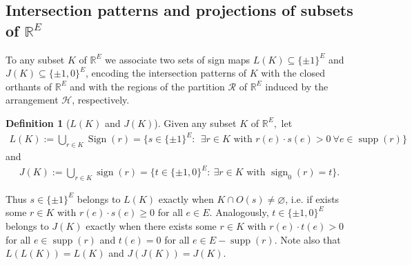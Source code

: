 \documentclass[11pt,a4paper]{amsart}
\theoremstyle{definition}
\newtheorem{definition}{Definition}
\numberwithin{equation}{section}
\DeclareMathOperator{\supp}{supp}
\DeclareMathOperator{\sign}{sign}
\DeclareMathOperator{\Baryc}{Baryc}
\DeclareMathOperator{\Sign}{Sign}
\newcommand{\covectors}{\ensuremath{L}}
\newcommand{\OO}{\ensuremath{{O}}}
\newcommand{\hcovectors}{J}
\begin{document}



\subsection{Intersection patterns and projections of subsets  of ${\mathbb R}^E$} To any subset $K$ of ${\mathbb R}^E$ we associate two sets of sign maps $L(K)\subseteq \{ \pm 1\}^E$ and $J(K)\subseteq \{ \pm 1, 0\}^E$,  encoding the intersection patterns of $K$ with the closed orthants of ${\mathbb R}^E$ and with the regions of the partition $\mathcal R$ of ${\mathbb R}^E$ induced by the arrangement $\mathcal H$, respectively.

\begin{definition} [$L(K)$ and $J(K)$]
Given any subset $K$ of ${\mathbb R}^E,$ let
\begin{align*}
L(K):=\bigcup_{r\in K}\Sign(r)=\{ s\in \{ \pm 1\}^E: ~~\exists r\in K \mbox{ with } r(e)\cdot s(e)>0 ~\forall e\in \supp(r)\}
\end{align*}
and
\begin{align*}
J(K):=\bigcup_{r\in K}\sign(r)=\{ t\in \{ \pm 1,0\}^E: ~\exists r\in K \mbox{ with } \sign_0(r)=t\}.
\end{align*}
\end{definition}

Thus $s\in \{\pm 1\}^E$ belongs to $L(K)$ exactly when $K\cap \OO(s)\ne\varnothing$, i.e. if exists some $r\in K$ with $r(e)\cdot s(e)\ge 0$ for all $e\in E$. Analogously, $t\in \{ \pm 1,0\}^E$ belongs to $J(K)$ exactly when there exists some $r\in K$ with $r(e)\cdot t(e)>0$ for all  $e\in \supp(r)$ and $t(e)=0$ for all $e\in E-\supp(r)$. Note also that $L(L(K))=L(K)$ and $J(J(K))=J(K)$.
\end{document}
